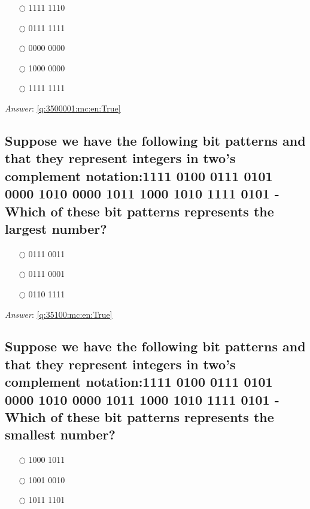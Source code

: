 \documentclass[a4paper,11pt,oneside]{article}
\begin{document}
\begin{sloppypar}
\label{q:3500001:mc:en:False}

\begin{itemize}
  \item[$\bigcirc$] 1111 1110
  \item[$\bigcirc$] 0111 1111
  \item[$\bigcirc$] 0000 0000
  \item[$\bigcirc$] 1000 0000
  \item[$\bigcirc$] 1111 1111
\end{itemize}

\vspace{1cm}

\textit{Answer}: \autoref{q:3500001:mc:en:True}



\subsection{Suppose we have the following bit patterns and that they represent integers in two's complement notation:1111 0100 0111 0101 0000 1010 0000 1011 1000 1010 1111 0101 - Which of these bit patterns represents the largest number?}

\label{q:35100:mc:en:False}

\begin{itemize}
  \item[$\bigcirc$] 0111 0011
  \item[$\bigcirc$] 0111 0001
  \item[$\bigcirc$] 0110 1111
\end{itemize}

\vspace{1cm}

\textit{Answer}: \autoref{q:35100:mc:en:True}

\subsection{Suppose we have the following bit patterns and that they represent integers in two's complement notation:1111 0100 0111 0101 0000 1010 0000 1011 1000 1010 1111 0101 - Which of these bit patterns represents the smallest number?}

\label{q:3510001:mc:en:False}

\begin{itemize}
  \item[$\bigcirc$] 1000 1011
  \item[$\bigcirc$] 1001 0010
  \item[$\bigcirc$] 1011 1101
\end{itemize}


\end{sloppypar}
\end{document}
